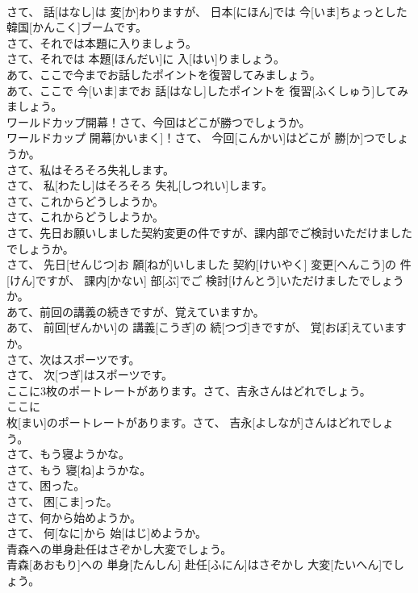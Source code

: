 \documentclass[8pt]{extreport}
\begin{document}
\begin{CJK}{UTF8}{min}
\\	さて、 話[はなし]は 変[か]わりますが、 日本[にほん]では 今[いま]ちょっとした 韓国[かんこく]ブームです。
\\	さて、それでは本題に入りましょう。	
\\	さて、それでは 本題[ほんだい]に 入[はい]りましょう。
\\	あて、ここで今までお話したポイントを復習してみましょう。	
\\	あて、ここで 今[いま]までお 話[はなし]したポイントを 復習[ふくしゅう]してみましょう。
\\	ワールドカップ開幕！さて、今回はどこが勝つでしょうか。	
\\	ワールドカップ 開幕[かいまく]！さて、 今回[こんかい]はどこが 勝[か]つでしょうか。
\\	さて、私はそろそろ失礼します。	
\\	さて、 私[わたし]はそろそろ 失礼[しつれい]します。
\\	さて、これからどうしようか。	
\\	さて、これからどうしようか。
\\	さて、先日お願いしました契約変更の件ですが、課内部でご検討いただけましたでしょうか。	
\\	さて、 先日[せんじつ]お 願[ねが]いしました 契約[けいやく] 変更[へんこう]の 件[けん]ですが、 課内[かない] 部[ぶ]でご 検討[けんとう]いただけましたでしょうか。
\\	あて、前回の講義の続きですが、覚えていますか。	
\\	あて、 前回[ぜんかい]の 講義[こうぎ]の 続[つづ]きですが、 覚[おぼ]えていますか。
\\	さて、次はスポーツです。	
\\	さて、 次[つぎ]はスポーツです。
\\	ここに3枚のポートレートがあります。さて、吉永さんはどれでしょう。	
\\	ここに 
\\	枚[まい]のポートレートがあります。さて、 吉永[よしなが]さんはどれでしょう。
\\	さて、もう寝ようかな。	
\\	さて、もう 寝[ね]ようかな。
\\	さて、困った。	
\\	さて、 困[こま]った。
\\	さて、何から始めようか。	
\\	さて、 何[なに]から 始[はじ]めようか。
\\	青森への単身赴任はさぞかし大変でしょう。	
\\	青森[あおもり]への 単身[たんしん] 赴任[ふにん]はさぞかし 大変[たいへん]でしょう。

\end{CJK}
\end{document}
